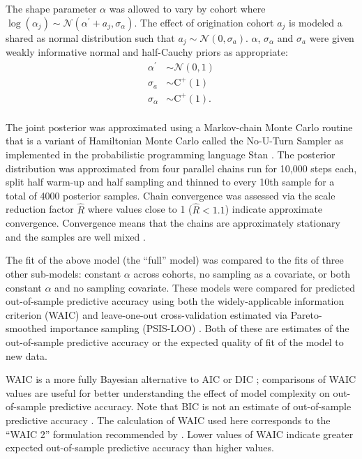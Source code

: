\documentclass{article}
\begin{document}
The shape parameter \(\alpha\) was allowed to vary by cohort where \(\log(\alpha_{j}) \sim \mathcal{N}(\alpha^{\prime} + a_{j}, \sigma_{\alpha})\). The effect of origination cohort \(a_{j}\) is modeled a shared as normal distribution such that \(a_{j} \sim \mathcal{N}(0, \sigma_{a})\). \(\alpha\), \(\sigma_{\alpha}\) and \(\sigma_{a}\) were given weakly informative normal and half-Cauchy priors as appropriate: 
\begin{equation}
  \begin{aligned}
    \alpha^{\prime} &\sim \mathcal{N}(0, 1) \\
    \sigma_{a} &\sim \mathrm{C^{+}}(1) \\
    \sigma_{\alpha} &\sim \mathrm{C^{+}}(1). \\
  \end{aligned}
  \label{eq:alpha_prior}
\end{equation}


The joint posterior was approximated using a Markov-chain Monte Carlo routine that is a variant of Hamiltonian Monte Carlo called the No-U-Turn Sampler \citep{Hoffman2014} as implemented in the probabilistic programming language Stan \citep{2014stan}. The posterior distribution was approximated from four parallel chains run for 10,000 steps each, split half warm-up and half sampling and thinned to every 10th sample for a total of 4000 posterior samples. Chain convergence was assessed via the scale reduction factor \(\hat{R}\) where values close to 1 (\(\hat{R} < 1.1\)) indicate approximate convergence. Convergence means that the chains are approximately stationary and the samples are well mixed \citep{Gelman2013d}.

The fit of the above model (the ``full'' model) was compared to the fits of three other sub-models: constant \(\alpha\) across cohorts, no sampling as a covariate, or both constant \(\alpha\) and no sampling covariate. These models were compared for predicted out-of-sample predictive accuracy using both the widely-applicable information criterion (WAIC) and leave-one-out cross-validation estimated via Pareto-smoothed importance sampling (PSIS-LOO) \citep{Vehtari2015}. Both of these are estimates of the out-of-sample predictive accuracy or the expected quality of fit of the model to new data. 

WAIC is a more fully Bayesian alternative to AIC or DIC \citep{Watanabe2010a,Gelman2013d}; comparisons of WAIC values are useful for better understanding the effect of model complexity on out-of-sample predictive accuracy. Note that BIC is not an estimate of out-of-sample predictive accuracy \citep{Gelman2013d}. The calculation of WAIC used here corresponds to the ``WAIC 2'' formulation recommended by \citet{Gelman2013d}. Lower values of WAIC indicate greater expected out-of-sample predictive accuracy than higher values.
\end{document}
